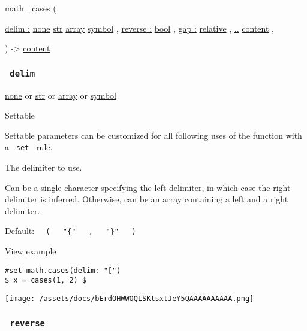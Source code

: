 math { . } { cases } (

{ \hyperref[parameters-delim]{delim :}
\href{/docs/reference/foundations/none/}{none}
\href{/docs/reference/foundations/str/}{str}
\href{/docs/reference/foundations/array/}{array}
\href{/docs/reference/symbols/symbol/}{symbol} , } {
\hyperref[parameters-reverse]{reverse :}
\href{/docs/reference/foundations/bool/}{bool} , } {
\hyperref[parameters-gap]{gap :}
\href{/docs/reference/layout/relative/}{relative} , } {
\hyperref[parameters-children]{..}
\href{/docs/reference/foundations/content/}{content} , }

) -\textgreater{} \href{/docs/reference/foundations/content/}{content}

\subsubsection{\texorpdfstring{\texttt{\ delim\ }}{ delim }}\label{parameters-delim}

\href{/docs/reference/foundations/none/}{none} {or}
\href{/docs/reference/foundations/str/}{str} {or}
\href{/docs/reference/foundations/array/}{array} {or}
\href{/docs/reference/symbols/symbol/}{symbol}

{{ Settable }}

\label{parameters-delim-settable-tooltip}
Settable parameters can be customized for all following uses of the
function with a \texttt{\ set\ } rule.

The delimiter to use.

Can be a single character specifying the left delimiter, in which case
the right delimiter is inferred. Otherwise, can be an array containing a
left and a right delimiter.

Default:
\texttt{\ }{\texttt{\ (\ }}\texttt{\ }{\texttt{\ "\{"\ }}\texttt{\ }{\texttt{\ ,\ }}\texttt{\ }{\texttt{\ "\}"\ }}\texttt{\ }{\texttt{\ )\ }}\texttt{\ }


View example

\begin{verbatim}
#set math.cases(delim: "[")
$ x = cases(1, 2) $
\end{verbatim}

\texttt{[image: /assets/docs/bErdOHWWOQLSKtsxtJeY5QAAAAAAAAAA.png]}

\subsubsection{\texorpdfstring{\texttt{\ reverse\ }}{ reverse }}\label{parameters-reverse}

